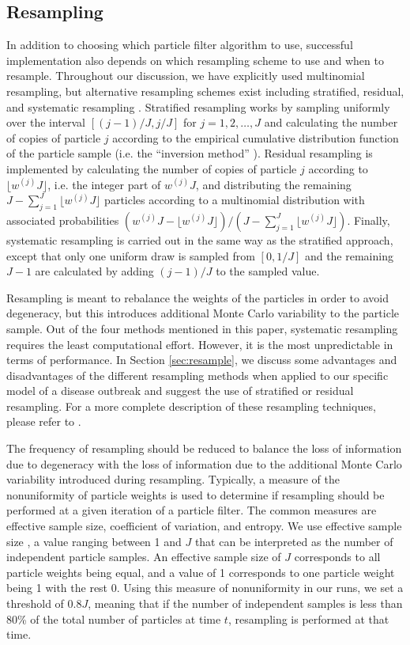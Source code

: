 \documentclass{elsarticle}
\begin{document}
\subsection{Resampling \label{sec:advice}}

In addition to choosing which particle filter algorithm to use, successful implementation also depends on which resampling scheme to use and when to resample. Throughout our discussion, we have explicitly used multinomial resampling, but alternative resampling schemes exist including stratified, residual, and systematic resampling \citep{Douc:Capp:Moul:comp:2005}. Stratified resampling works by sampling uniformly over the interval $[(j-1) / J, j / J]$ for $j = 1, 2, \ldots, J$ and calculating the number of copies of particle $j$ according to the empirical cumulative distribution function of the particle sample (i.e. the ``inversion method'' \citep{Douc:Capp:Moul:comp:2005}). Residual resampling is implemented by calculating the number of copies of particle $j$ according to $\lfloor w^{(j)} J \rfloor$, i.e. the integer part of $w^{(j)} J$, and distributing the remaining $J - \sum^J_{j=1} \lfloor w^{(j)} J \rfloor$  particles according to a multinomial distribution with associated probabilities $(w^{(j)} J - \lfloor w^{(j)} J \rfloor) / (J - \sum^J_{j=1} \lfloor w^{(j)} J \rfloor)$. Finally, systematic resampling is carried out in the same way as the stratified approach, except that only one uniform draw is sampled from $[0, 1/J]$ and the remaining $J-1$ are calculated by adding $(j-1) / J$ to the sampled value.

Resampling is meant to rebalance the weights of the particles in order to avoid degeneracy, but this introduces additional Monte Carlo variability to the particle sample. Out of the four methods mentioned in this paper, systematic resampling requires the least computational effort. However, it is the most unpredictable in terms of performance. In Section \ref{sec:resample}, we discuss some advantages and disadvantages of the different resampling methods when applied to our specific model of a disease outbreak and suggest the use of stratified or residual resampling. For a more complete description of these resampling techniques, please refer to \citet{Douc:Capp:Moul:comp:2005}.

The frequency of resampling should be reduced to balance the loss of information due to degeneracy with the loss of information due to the additional Monte Carlo variability introduced during resampling. Typically, a measure of the nonuniformity of particle weights is used to determine if resampling should be performed at a given iteration of a particle filter. The common measures are effective sample size, coefficient of variation, and entropy. We use effective sample size \citep{Liu:Chen:Wong:reje:1998}, a value ranging between 1 and $J$ that can be interpreted as the number of independent particle samples. An effective sample size of $J$ corresponds to all particle weights being equal, and a value of 1 corresponds to one particle weight being 1 with the rest 0. Using this measure of nonuniformity in our runs, we set a threshold of $0.8J$, meaning that if the number of independent samples is less than 80\% of the total number of particles at time $t$, resampling is performed at that time.
\end{document}
